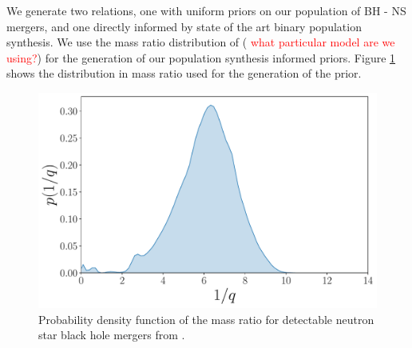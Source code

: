 \documentclass[twocolumn]{aastex631}
\newcommand{\red}[1]{\textcolor{red}{#1}}
\begin{document}
	We generate two relations, one with uniform priors on our population of BH - NS mergers, and one directly informed by state of the art binary population synthesis. We use the mass ratio distribution of \cite{2021Broekgaarden+}  (\red{ what particular model are we using?}) for the generation of our population synthesis informed priors. Figure \ref{fig:mass ratio distrbution} shows the distribution in mass ratio used for the generation of the prior. 
	\begin{figure}
		\centering
		\includegraphics[width=\linewidth]{NSBH_mass_ratio_density.pdf}
		\caption{Probability density function of the mass ratio for detectable neutron star black hole mergers from \citep{2021Broekgaarden+}.}
		\label{fig:mass ratio distrbution}
	\end{figure}
\end{document}
